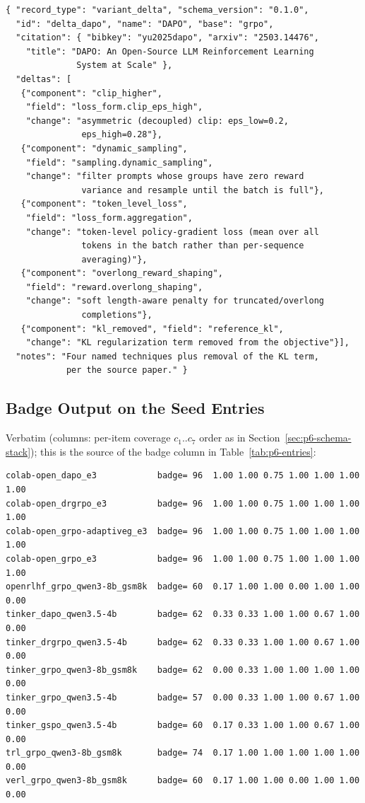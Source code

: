\documentclass{article}
\begin{document}
\begin{lstlisting}[basicstyle=\ttfamily\scriptsize, frame=single,
  caption={\texttt{entries/delta_dapo.json} (whitespace compressed).},
  label={lst:p6-delta-dapo}]
{ "record_type": "variant_delta", "schema_version": "0.1.0",
  "id": "delta_dapo", "name": "DAPO", "base": "grpo",
  "citation": { "bibkey": "yu2025dapo", "arxiv": "2503.14476",
    "title": "DAPO: An Open-Source LLM Reinforcement Learning
              System at Scale" },
  "deltas": [
   {"component": "clip_higher",
    "field": "loss_form.clip_eps_high",
    "change": "asymmetric (decoupled) clip: eps_low=0.2,
               eps_high=0.28"},
   {"component": "dynamic_sampling",
    "field": "sampling.dynamic_sampling",
    "change": "filter prompts whose groups have zero reward
               variance and resample until the batch is full"},
   {"component": "token_level_loss",
    "field": "loss_form.aggregation",
    "change": "token-level policy-gradient loss (mean over all
               tokens in the batch rather than per-sequence
               averaging)"},
   {"component": "overlong_reward_shaping",
    "field": "reward.overlong_shaping",
    "change": "soft length-aware penalty for truncated/overlong
               completions"},
   {"component": "kl_removed", "field": "reference_kl",
    "change": "KL regularization term removed from the objective"}],
  "notes": "Four named techniques plus removal of the KL term,
            per the source paper." }
\end{lstlisting}

\subsection{Badge Output on the Seed Entries}
\label{sec:p6-appendix-badge}
Verbatim (columns: per-item coverage $c_1..c_7$ order as in
Section~\ref{sec:p6-schema-stack}); this is the source of the badge column in
Table~\ref{tab:p6-entries}:

\begin{lstlisting}[basicstyle=\ttfamily\scriptsize, frame=single,
  caption={\texttt{python3 registry/query.py badge} (item columns
  abbreviated).}, label={lst:p6-badge-out}]
colab-open_dapo_e3            badge= 96  1.00 1.00 0.75 1.00 1.00 1.00 1.00
colab-open_drgrpo_e3          badge= 96  1.00 1.00 0.75 1.00 1.00 1.00 1.00
colab-open_grpo-adaptiveg_e3  badge= 96  1.00 1.00 0.75 1.00 1.00 1.00 1.00
colab-open_grpo_e3            badge= 96  1.00 1.00 0.75 1.00 1.00 1.00 1.00
openrlhf_grpo_qwen3-8b_gsm8k  badge= 60  0.17 1.00 1.00 0.00 1.00 1.00 0.00
tinker_dapo_qwen3.5-4b        badge= 62  0.33 0.33 1.00 1.00 0.67 1.00 0.00
tinker_drgrpo_qwen3.5-4b      badge= 62  0.33 0.33 1.00 1.00 0.67 1.00 0.00
tinker_grpo_qwen3-8b_gsm8k    badge= 62  0.00 0.33 1.00 1.00 1.00 1.00 0.00
tinker_grpo_qwen3.5-4b        badge= 57  0.00 0.33 1.00 1.00 0.67 1.00 0.00
tinker_gspo_qwen3.5-4b        badge= 60  0.17 0.33 1.00 1.00 0.67 1.00 0.00
trl_grpo_qwen3-8b_gsm8k       badge= 74  0.17 1.00 1.00 1.00 1.00 1.00 0.00
verl_grpo_qwen3-8b_gsm8k      badge= 60  0.17 1.00 1.00 0.00 1.00 1.00 0.00
\end{lstlisting}
\end{document}
